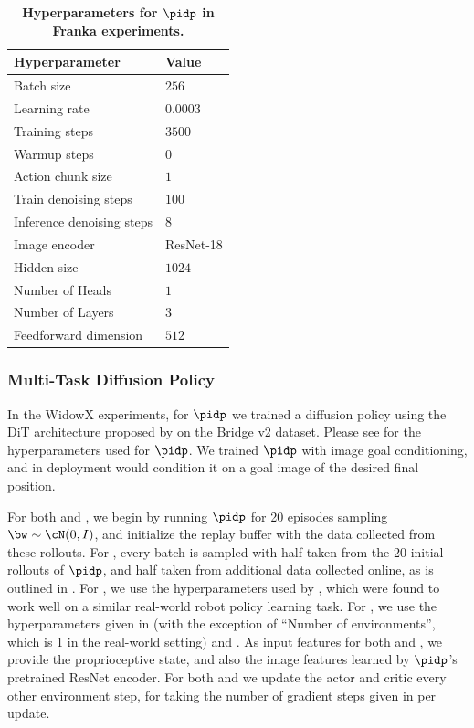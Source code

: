 \begin{table}
\caption{
\footnotesize
\textbf{Hyperparameters for $\pidp$ in Franka experiments.}
}
\label{tab:serl_diffusion_params}
\vspace{5pt}
\begin{center}
\scalebox{0.9}
{
\begin{tabular}{ll}
    \toprule
    \textbf{Hyperparameter} & Value \\
    \midrule
Batch size &  $256$ \\
Learning rate & $0.0003$ \\
Training steps & $3500$ \\
Warmup steps & $0$ \\
\hline
Action chunk size & $1$ \\
Train denoising steps & $100$ \\
Inference denoising steps & $8$ \\
Image encoder & ResNet-18 \\
Hidden size & $1024$ \\
Number of Heads & $1$ \\
Number of Layers & $3$ \\
Feedforward dimension & $512$ \\
    \bottomrule
\end{tabular}
}
\end{center}
\end{table}


\subsubsection{Multi-Task Diffusion Policy}
In the WidowX experiments, for $\pidp$ we trained a diffusion policy using the DiT architecture proposed by \cite{dasari2024ingredients} on the Bridge v2 dataset. Please see  for the hyperparameters used for $\pidp$. 
We trained $\pidp$ with image goal conditioning, and in deployment would condition it on a goal image of the desired final position. 

For both \algname and \rlpd, we begin by running $\pidp$ for 20 episodes sampling $\bw \sim \cN(0,I)$, and initialize the replay buffer with the data collected from these rollouts. For \rlpd, every batch is sampled with half taken from the 20 initial rollouts of $\pidp$, and half taken from additional data collected online, as is outlined in \cite{ball2023efficient}. For \rlpd, we use the hyperparameters used by \citet{luo2024precise}, which were found to work well on a similar real-world robot policy learning task. For \algname, we use the hyperparameters given in  (with the exception of ``Number of environments'', which is 1 in the real-world setting) and . As input features for both \algname and \rlpd, we provide the proprioceptive state, and also the image features learned by $\pidp$'s pretrained ResNet encoder.
For both \algname and \rlpd we update the actor and critic every other environment step, for \algname taking the number of gradient steps given in  per update.


